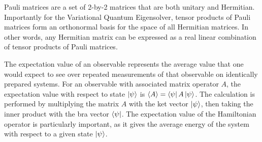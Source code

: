 Pauli matrices are a set of 2-by-2 matrices that are both unitary and Hermitian.  Importantly for the Variational Quantum Eigensolver, tensor products of Pauli matrices form an orthonormal basis for the space of all Hermitian matrices.  In other words, any Hermitian matrix can be expressed as a real linear combination of tensor products of Pauli matrices.

The expectation value of an observable represents the average value that one would expect to see over repeated measurements of that observable on identically prepared systems. For an observable with associated matrix operator $A$, the expectation value with respect to state $\ket{\psi}$ is $\expval{A} = \bra{\psi}A\ket{\psi}$.  The calculation is performed by multiplying the matrix $A$ with the ket vector $\ket{\psi}$, then taking the inner product with the bra vector $\bra{\psi}$.  The expectation value of the Hamiltonian operator is particularly important, as it gives the average energy of the system with respect to a given state $\ket{\psi}$.


